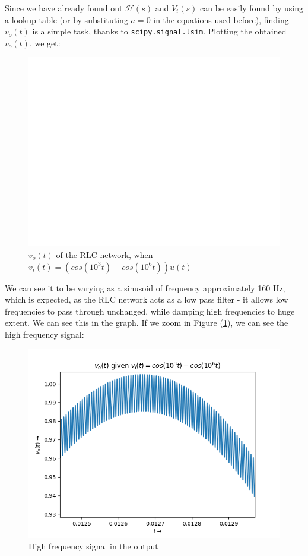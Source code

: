 \documentclass[11pt, a4paper, twoside]{article}
\begin{document}
    Since we have already found out $\mathcal{H}(s)$ and $V_i(s)$ can be easily found by using a lookup table (or by substituting $a=0$ in the equations used before), finding $v_o(t)$ is a simple task, thanks to \texttt{scipy.signal.lsim}. Plotting the obtained $v_o(t)$, we get:
    \begin{figure}[H]
        \centering
        \includegraphics[scale=0.7]{Fig 6(a).png}
        \caption{$v_o(t)$ of the RLC network, when $v_i(t) = (cos(10^3t)-cos(10^6t))u(t)$}
        \label{fig:Fig6a}
    \end{figure}

    We can see it to be varying as a sinusoid of frequency approximately 160 Hz, which is expected, as the RLC network acts as a low pass filter - it allows low frequencies to pass through unchanged, while damping high frequencies to huge extent. We can see this in the graph. If we zoom in Figure (\ref{fig:Fig6a}), we can see the high frequency signal:
    \begin{figure}[H]
        \centering
        \includegraphics[scale=0.7]{Fig 6(c).png}
        \caption{High frequency signal in the output}
        \label{fig:Fig6c}
    \end{figure}
\end{document}
